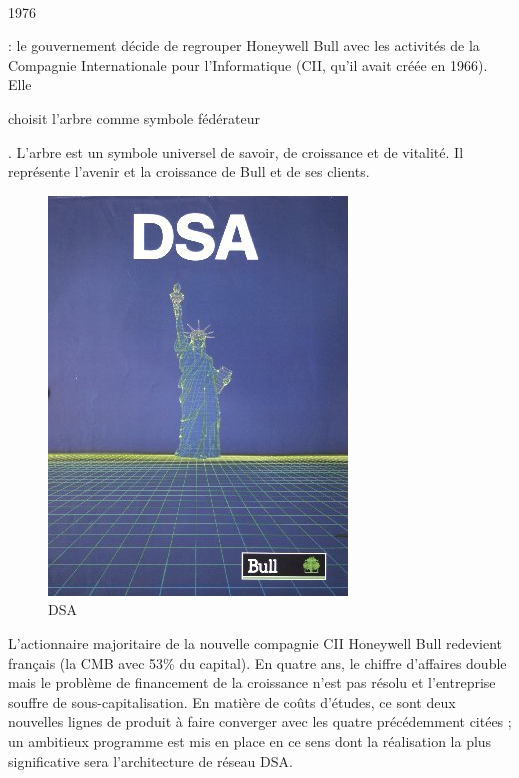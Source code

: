 \documentclass[11pt]{article}
\begin{document}
		\paragraph{}
		\begin{bf}1976\end{bf}: le gouvernement décide de regrouper Honeywell Bull avec les activités de la Compagnie 
		Internationale pour l’Informatique (CII, qu’il avait créée en 1966). Elle \begin{bf}choisit l’arbre comme symbole 
		fédérateur\end{bf}. L’arbre est un symbole universel de savoir, de croissance et de vitalité. Il représente l’avenir 
		et la croissance de Bull et de ses clients.\newline{}
		\begin{figure}
		\includegraphics[scale=0.25]{dsa_vf.jpg}
		\caption{DSA}
		\end{figure} 
		L’actionnaire majoritaire de la nouvelle compagnie CII Honeywell Bull redevient français (la CMB avec 53\% du capital). 
		En quatre ans, le chiffre d’affaires double mais le problème de financement de la croissance n’est pas résolu et 
		l’entreprise souffre de sous-capitalisation. En matière de coûts d’études, ce sont deux nouvelles lignes de produit à 
		faire converger avec les quatre précédemment citées ; un ambitieux programme est mis en place en ce sens dont la 
		réalisation la plus significative sera l’architecture de réseau DSA.
		\newline{}
		\newline{}
		\newline{}
		\newline{}
		\newline{}
		\newline{}
\end{document}
